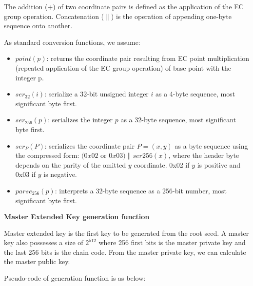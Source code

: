 The addition (+) of two coordinate pairs is defined as the application of the EC group operation. Concatenation ($\parallel$) is the operation of appending one-byte sequence onto another.

As standard conversion functions, we assume:

\begin{itemize}
    \item $point(p)$: returns the coordinate pair resulting from EC point multiplication (repeated application of the EC group operation) of base point with the integer p.
  
    \item $ser_{32}(i)$: serialize a 32-bit unsigned integer $i$ as a 4-byte sequence, most significant byte first.
  
    \item $ser_{256}(p)$: serializes the integer $p$ as a 32-byte sequence, most significant byte first.
    \item $ser_P(P)$: serializes the coordinate pair $P = (x,y)$ as a byte sequence using the compressed form: $(0x02$ or $0x03) \parallel ser256(x)$, where the header byte depends on the parity of the omitted $y$ coordinate. 0x02 if $y$ is positive and 0x03 if $y$ is negative.
    \item $parse_{256}(p)$: interprets a 32-byte sequence as a 256-bit number, most significant byte first.
\end{itemize}


\bigskip
{\textbf{Master Extended Key generation function}}

Master extended key is the first key to be generated from the root seed. A master key also possesses a size of $2^{512}$ where 256 first bits is the master private key and the last 256 bits is the chain code. From the master private key, we can calculate the master public key.

Pseudo-code of generation function is as below:

